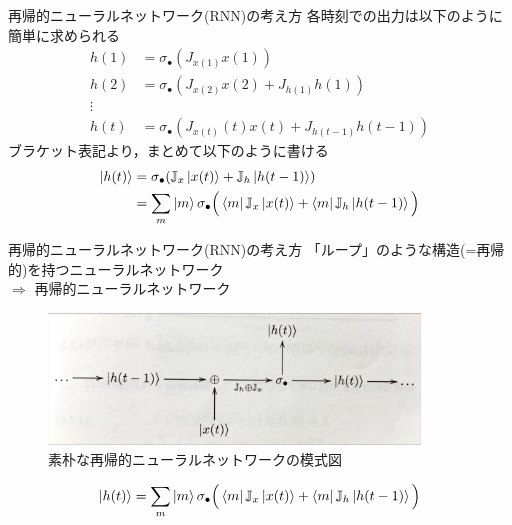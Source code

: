 \documentclass[dvipdfmx,10pt]{beamer}
\begin{document}
  \begin{frame}{再帰的ニューラルネットワーク(RNN)の考え方}
    各時刻での出力は以下のように簡単に求められる
    \begin{align*}
      h(1) &= \sigma_{\bullet}(J_{x(1)}x(1))\\
      h(2) &= \sigma_{\bullet}(J_{x(2)}x(2) + J_{h(1)}h(1))\\
      \vdots\\
      h(t) &= \sigma_{\bullet}(J_{x(t)}(t)x(t) + J_{h(t-1)}h(t-1))
    \end{align*}
    ブラケット表記より，まとめて以下のように書ける
    \begin{align*}
      \ket{h(t)} &= \sigma_{\bullet}(\mathbb{J}_x\ket{x(t)} + \mathbb{J}_h\ket{h(t-1)})\\
      &= \sum_{m}\ket{m}\sigma_{\bullet}\Big(\bra{m}\mathbb{J}_x\ket{x(t)} + \bra{m}\mathbb{J}_h\ket{h(t-1)}\Big)
    \end{align*}
  \end{frame}

  \begin{frame}{再帰的ニューラルネットワーク(RNN)の考え方}
    「ループ」のような構造(=再帰的)を持つニューラルネットワーク\\
    $\Rightarrow$ 再帰的ニューラルネットワーク
    \begin{figure}
      \begin{center}
        \includegraphics[height=3.5cm]{RNN_diagram.jpeg}
      \end{center}
      \caption{素朴な再帰的ニューラルネットワークの模式図} 
    \end{figure}
    \begin{equation*}
      \ket{h(t)} = \sum_{m}\ket{m}\sigma_{\bullet}\Big(\bra{m}\mathbb{J}_x\ket{x(t)} + \bra{m}\mathbb{J}_h\ket{h(t-1)}\Big)
    \end{equation*}
  \end{frame}
\end{document}
